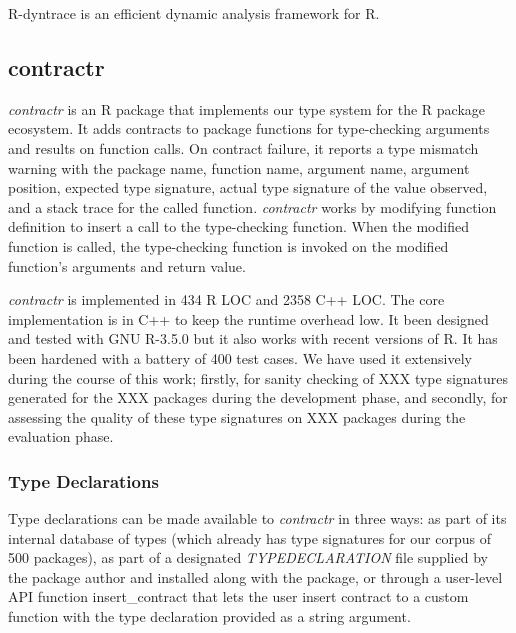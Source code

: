 \documentclass[acmsmall,review,anonymous]{acmart}\settopmatter{printfolios=true,printccs=false,printacmref=false}
\newcommand{\contractr}{\emph{contractr}\xspace} %
\begin{document}
R-dyntrace is an efficient dynamic analysis framework for R.

\subsection{contractr}
\label{sec:contractr}

\contractr is an R package that implements our type system for the R
package ecosystem. It adds contracts to package functions for type-checking
arguments and results on function calls. On contract failure, it reports a type
mismatch warning with the package name, function name, argument name, argument
position, expected type signature, actual type signature of the value observed,
and a stack trace for the called function. \contractr works by modifying
function definition to insert a call to the type-checking function. When the
modified function is called, the type-checking function is invoked on the
modified function's arguments and return value.

\contractr is implemented in 434 R LOC and 2358 C++ LOC. The core
implementation is in C++ to keep the runtime overhead low. It been designed and
tested with GNU R-3.5.0 but it also works with recent versions of R. It has been
hardened with a battery of 400 test cases. We have used it extensively during
the course of this work; firstly, for sanity checking of XXX type signatures
generated for the XXX packages during the development phase, and secondly, for
assessing the quality of these type signatures on XXX packages during the
evaluation phase.

%
%
\subsubsection{Type Declarations}
Type declarations can be made available to \contractr in three ways: as
part of its internal database of types (which already has type signatures for
our corpus of 500 packages), as part of a designated \emph{TYPEDECLARATION} file
supplied by the package author and installed along with the package, or through
a user-level API function insert\_contract that lets the user insert contract to
a custom function with the type declaration provided as a string argument.

%
%
\end{document}
